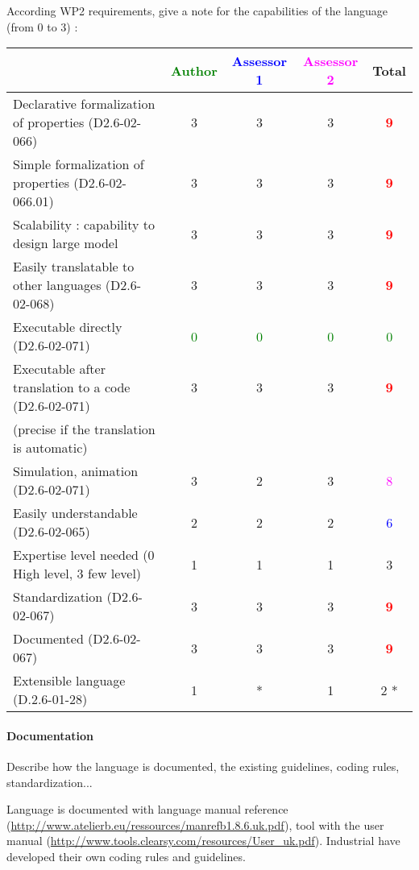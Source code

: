 According WP2 requirements, give a note for the capabilities of the language (from 0 to 3) :

\begin{tabular}{|l | c | c | c | c|}
\hline
& \textcolor{green}{Author} & \textcolor{blue}{Assessor 1} & \textcolor{magenta}{Assessor 2} & Total \\
\hline
Declarative formalization of properties (D2.6-02-066) & 3    & 3    & 3    & \textcolor{red}{\textbf{9}} \\
\hline
Simple formalization of properties (D2.6-02-066.01) & 3    & 3    & 3    & \textcolor{red}{\textbf{9}}  \\
\hline
Scalability : capability to design large model & 3    & 3    & 3    & \textcolor{red}{\textbf{9}} \\
\hline
Easily translatable to other languages (D2.6-02-068) & 3    & 3    & 3    & \textcolor{red}{\textbf{9}} \\
\hline
Executable directly (D2.6-02-071) & \textcolor{green}{0} & \textcolor{green}{0} & \textcolor{green}{0} & \textcolor{green}{0} \\
\hline
Executable after translation to a code (D2.6-02-071) & 3    & 3    & 3    & \textcolor{red}{\textbf{9}} \\
(precise if the translation is automatic) & & & & \\
\hline
Simulation, animation (D2.6-02-071) &  3 & 2    & 3    & \textcolor{magenta}{8} \\
\hline
Easily understandable (D2.6-02-065) & 2    & 2    & 2    & \textcolor{blue}{6} \\
\hline
Expertise level needed (0 High level, 3 few level) &  1 & 1    & 1    & 3    \\
\hline
Standardization (D2.6-02-067) & 3    & 3    & 3    & \textcolor{red}{\textbf{9}} \\
\hline
Documented (D2.6-02-067) & 3    & 3    & 3    & \textcolor{red}{\textbf{9}} \\
\hline
Extensible language (D.2.6-01-28) & 1    & * & 1    & 2   * \\
\hline
\end{tabular}


\paragraph{Documentation} Describe how the language is documented, the existing guidelines, coding rules, standardization...

\begin{author_comment}

Language is documented with language manual reference (\url{http://www.atelierb.eu/ressources/manrefb1.8.6.uk.pdf}), tool with the user manual (\url{http://www.tools.clearsy.com/resources/User_uk.pdf}). Industrial have developed their own coding rules and guidelines.
\end{author_comment}

